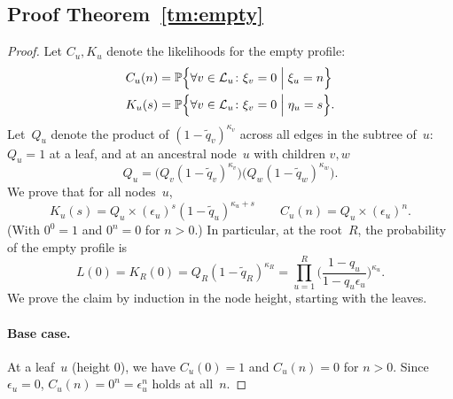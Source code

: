 \documentclass{elsarticle}
\newcommand{\condgen}[6]{{#1}#2 #5 #3 #6 #4}
\newcommand{\PROB}{\mathbb{P}}
\newcommand{\Probcmd}[2]{\condgen{\PROB}{\Bigl\{}{\Bigm|}{\Bigr\}}{#1}{#2}}
\newcommand{\nlik}{C}
\newcommand{\slik}{K}
\newcommand{\nx}{u}
\newcommand{\ny}{v}
\newcommand{\nz}{w}
\newcommand{\troot}{R}
\begin{document}
\subsection{Proof Theorem~\ref{tm:empty}}
\begin{proof}
Let $\nlik_{\nx},\slik_{\nx}$ denote the likelihoods 
for the empty profile: 
\begin{align*}
\nlik_{\nx}(n) & = \Probcmd{\forall \ny\in \mathcal{L}_{\nx} \colon \xi_{\ny}=0}{\xi_{\nx}=n}
\\
\slik_{\nx}(s) &= \Probcmd{\forall \ny \in \mathcal{L}_{\nx} \colon \xi_{\ny}=0}{\eta_{\nx}=s}.
\end{align*}
%
Let~$Q_{\nx}$ denote the product of $(1-\tilde{q}_{\ny})^{\kappa_{\ny}}$
across all edges in the subtree of~$\nx$:
$Q_{\nx}=1$ at a leaf, and at an ancestral node~$\nx$
with children $\ny,\nz$
\[
Q_{\nx} = \bigl(Q_{\ny} (1-\tilde{q}_{\ny})^{\kappa_{\ny}}\bigr)
	\bigl(Q_{\nz} (1-\tilde{q}_{\nz})^{\kappa_{\nz}}\bigr).
\] 
We prove that for all nodes~$\nx$,
\[
\slik_{\nx}(s) = Q_{\nx} \times (\epsilon_{\nx})^s (1-\tilde{q}_{\nx})^{\kappa_{\nx}+s} 
\qquad
\nlik_{\nx}(n) = Q_{\nx} \times (\epsilon_{\nx})^n.
\]
(With $0^0=1$ and $0^n=0$ for $n>0$.)
In particular, at the root~$R$, the 
probability of the empty profile is 
\[
L(0) = \slik_{\troot}(0) = Q_{\troot} (1-\tilde{q}_{\troot})^{\kappa_{\troot}}
	= \prod_{\nx=1}^R \biggl(\frac{1-q_{\nx}}{1-q_{\nx}\epsilon_{\nx}}\biggr)^{\kappa_{\nx}}.
\]
We prove the claim 
by induction in the node height, 
starting with the leaves. 

\paragraph{Base case.} At a leaf~$\nx$ (height 0), we have $\nlik_{\nx}(0)=1$
and $\nlik_{\nx}(n)=0$ for $n>0$. 
Since $\epsilon_{\nx}=0$, $\nlik_{\nx}(n)=0^n = \epsilon_{\nx}^n$ holds at all~$n$.  


\end{proof}
\end{document}
